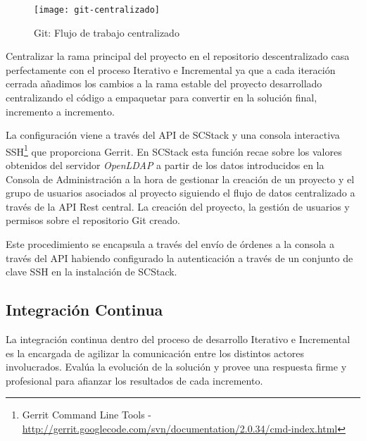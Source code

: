 \begin{figure}[H]
    \centering
    \texttt{[image: git-centralizado]}
    \caption{Git: Flujo de trabajo centralizado}
    \label{fig:git-centralizado}
\end{figure}

\par Centralizar la rama principal del proyecto en el repositorio descentralizado casa perfectamente con el proceso Iterativo e Incremental ya que a cada iteración cerrada añadimos los cambios a la rama estable del proyecto desarrollado centralizando el código a empaquetar para convertir en la solución final, incremento a incremento.

\par La configuración viene a través del API de SCStack y una consola interactiva SSH\footnote{Gerrit Command Line Tools - \url{http://gerrit.googlecode.com/svn/documentation/2.0.34/cmd-index.html}} que proporciona Gerrit. En SCStack esta función recae sobre los valores obtenidos del servidor \emph{OpenLDAP} a partir de los datos introducidos en la Consola de Administración a la hora de gestionar la creación de un proyecto y el grupo de usuarios asociados al proyecto siguiendo el flujo de datos centralizado a través de la API Rest central. La creación del proyecto, la gestión de usuarios y permisos sobre el repositorio Git creado.

\par Este procedimiento se encapsula a través del envío de órdenes a la consola a través del API habiendo configurado la autenticación a través de un conjunto de clave SSH en la instalación de SCStack.



\subsection{Integración Continua}
\label{sub:ci-jenkins}

\par  La integración continua dentro del proceso de desarrollo Iterativo e Incremental es la encargada de agilizar la comunicación entre los distintos actores involucrados. Evalúa la evolución de la solución y provee una respuesta firme y profesional para afianzar los resultados de cada incremento.

